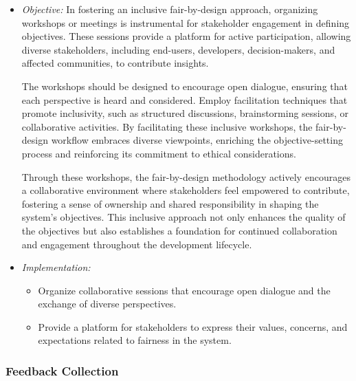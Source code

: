 \begin{itemize}

    \item \emph{Objective:} In fostering an inclusive fair-by-design approach, organizing workshops or meetings is instrumental for stakeholder engagement in defining objectives. These sessions provide a platform for active participation, allowing diverse stakeholders, including end-users, developers, decision-makers, and affected communities, to contribute insights.

    The workshops should be designed to encourage open dialogue, ensuring that each perspective is heard and considered. Employ facilitation techniques that promote inclusivity, such as structured discussions, brainstorming sessions, or collaborative activities. By facilitating these inclusive workshops, the fair-by-design workflow embraces diverse viewpoints, enriching the objective-setting process and reinforcing its commitment to ethical considerations.
    
    Through these workshops, the fair-by-design methodology actively encourages a collaborative environment where stakeholders feel empowered to contribute, fostering a sense of ownership and shared responsibility in shaping the system's objectives. This inclusive approach not only enhances the quality of the objectives but also establishes a foundation for continued collaboration and engagement throughout the development lifecycle.

    \item \emph{Implementation:}

    \begin{itemize}

        \item Organize collaborative sessions that encourage open dialogue and the exchange of diverse perspectives.

        \item Provide a platform for stakeholders to express their values, concerns, and expectations related to fairness in the system.

    \end{itemize}

\end{itemize}

\subsubsection{Feedback Collection}

